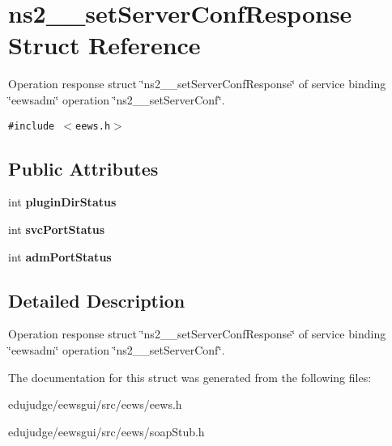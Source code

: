 \section{ns2\_\-\_\-setServerConfResponse Struct Reference}
\label{structns2____setServerConfResponse}
Operation response struct \char`\"{}ns2\_\-\_\-setServerConfResponse\char`\"{} of service binding \char`\"{}eewsadm\char`\"{} operation \char`\"{}ns2\_\-\_\-setServerConf\char`\"{}.  


{\tt \#include $<$eews.h$>$}

\subsection*{Public Attributes}
\begin{CompactItemize}
\item 
int \textbf{pluginDirStatus}\label{structns2____setServerConfResponse_a1ec95c03b3d551ccc2963fa7695c1f8}

\item 
int \textbf{svcPortStatus}\label{structns2____setServerConfResponse_ef8eaedb6f964b15fbd920d965dbc02c}

\item 
int \textbf{admPortStatus}\label{structns2____setServerConfResponse_b73c41c600fb5a7c190bbb8b0c11f379}

\end{CompactItemize}


\subsection{Detailed Description}
Operation response struct \char`\"{}ns2\_\-\_\-setServerConfResponse\char`\"{} of service binding \char`\"{}eewsadm\char`\"{} operation \char`\"{}ns2\_\-\_\-setServerConf\char`\"{}. 

The documentation for this struct was generated from the following files:\begin{CompactItemize}
\item 
edujudge/eewsgui/src/eews/eews.h\item 
edujudge/eewsgui/src/eews/soapStub.h\end{CompactItemize}
